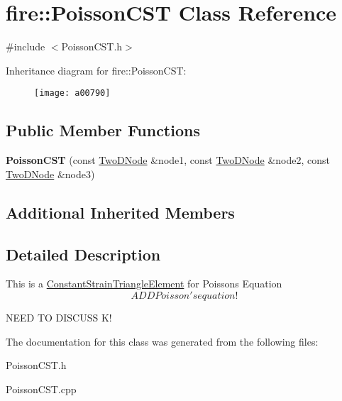 \hypertarget{a00790}{}\section{fire\+:\+:Poisson\+C\+ST Class Reference}
\label{a00790}


{\ttfamily \#include $<$Poisson\+C\+S\+T.\+h$>$}

Inheritance diagram for fire\+:\+:Poisson\+C\+ST\+:\begin{figure}[H]
\begin{center}
\leavevmode
\texttt{[image: a00790]}
\end{center}
\end{figure}
\subsection*{Public Member Functions}
\begin{DoxyCompactItemize}
\item 
\mbox{\label{a00790_ab45e61d417f5bbf0803d884bfb2db07f}} 
{\bfseries Poisson\+C\+ST} (const \hyperlink{a00195_a92dafcc05a788e1065a5792b67f0f70e}{Two\+D\+Node} \&node1, const \hyperlink{a00195_a92dafcc05a788e1065a5792b67f0f70e}{Two\+D\+Node} \&node2, const \hyperlink{a00195_a92dafcc05a788e1065a5792b67f0f70e}{Two\+D\+Node} \&node3)
\end{DoxyCompactItemize}
\subsection*{Additional Inherited Members}


\subsection{Detailed Description}
This is a \hyperlink{a00770}{Constant\+Strain\+Triangle\+Element} for Poisson\textquotesingle{}s Equation \[ ADD Poisson's equation! \]

N\+E\+ED TO D\+I\+S\+C\+U\+SS K! 

The documentation for this class was generated from the following files\+:\begin{DoxyCompactItemize}
\item 
Poisson\+C\+S\+T.\+h\item 
Poisson\+C\+S\+T.\+cpp\end{DoxyCompactItemize}
